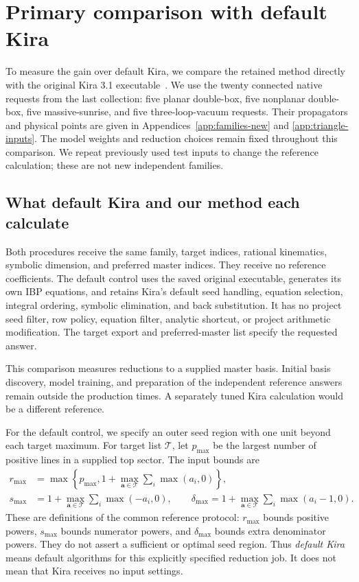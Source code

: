 \section{Primary comparison with default Kira}
\label{sec:default-kira-final}
To measure the gain over default Kira, we compare the retained method directly with the original Kira 3.1 executable~\cite{Kira3}. We use the twenty connected native requests from the last collection: five planar double-box, five nonplanar double-box, five massive-sunrise, and five three-loop-vacuum requests. Their propagators and physical points are given in Appendices~\ref{app:families-new} and \ref{app:triangle-inputs}. The model weights and reduction choices remain fixed throughout this comparison. We repeat previously used test inputs to change the reference calculation; these are not new independent families.

\subsection{What default Kira and our method each calculate}
Both procedures receive the same family, target indices, rational kinematics, symbolic dimension, and preferred master indices. They receive no reference coefficients. The default control uses the saved original executable, generates its own IBP equations, and retains Kira's default seed handling, equation selection, integral ordering, symbolic elimination, and back substitution. It has no project seed filter, row policy, equation filter, analytic shortcut, or project arithmetic modification. The target export and preferred-master list specify the requested answer.

This comparison measures reductions to a supplied master basis. Initial basis discovery, model training, and preparation of the independent reference answers remain outside the production times. A separately tuned Kira calculation would be a different reference.

For the default control, we specify an outer seed region with one unit beyond each target maximum. For target list $\mathcal T$, let $p_{\max}$ be the largest number of positive lines in a supplied top sector. The input bounds are
\begin{align}
 r_{\max}&=\max\!\left\{p_{\max},1+\max_{\boldsymbol a\in\mathcal T}\sum_i\max(a_i,0)\right\},\nonumber\\
 s_{\max}&=1+\max_{\boldsymbol a\in\mathcal T}\sum_i\max(-a_i,0),\qquad
 \delta_{\max}=1+\max_{\boldsymbol a\in\mathcal T}\sum_i\max(a_i-1,0).
 \label{eq:default-input-bounds}
\end{align}
These are definitions of the common reference protocol: $r_{\max}$ bounds positive powers, $s_{\max}$ bounds numerator powers, and $\delta_{\max}$ bounds extra denominator powers. They do not assert a sufficient or optimal seed region. Thus \emph{default Kira} means default algorithms for this explicitly specified reduction job. It does not mean that Kira receives no input settings.

